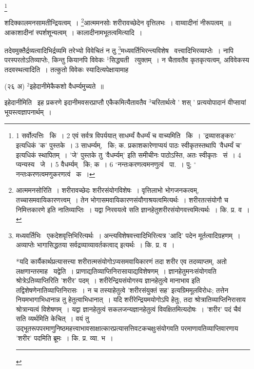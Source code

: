 \documentclass[11pt, openany]{book}
\newcommand\blfootnote[1]{%
 \begingroup
 \renewcommand\thefootnote{}\footnote{#1}%
 \addtocounter{footnote}{-1}%
 \endgroup
}
\begin{document}
\blfootnote{1 सर्वोत्पत्तिः  \textendash\ कि~। 2 एवं सर्वत्र विपर्ययात् साधर्म्यं वैधर्म्यं च वाच्यमिति  \textendash\ कि~। 'द्रव्यासङ्करः' इत्यधिकं 'क' पुस्तके~। 3 साधर्म्यम्, \textendash\ कि; क. प्रकाशकारेणाप्ययं पाठः स्वीकृतस्तथापि 'वैधर्म्यं च' इत्यधिकं स्थापितम्~। 'जे' पुस्तके तु 'वैधर्म्यम्' इति समीचीनः पाठोऽस्ति, अतः स्वीकृतः  \textendash\ सं~। 4 प्यन्यस्य \textendash\ जे~। 5 वैधर्म्यम्  \textendash\ कि; क~। 6 ${}^\circ$नन्तःकरणत्वमनणुत्वं \textendash\ पा.~। पु; ${}^\circ$नन्तःकरणत्वमणुकरणत्वं  \textendash\ क~।}

\newpage
\noindent
शदिक्कालमनसामतीन्द्रियत्वम्~। \renewcommand{\thefootnote}{१}\footnote{आत्ममनसोरिति~। शरीरावच्छेदः शरीरसंयोगविशेषः~। वृत्तिलाभो भोगजनकत्वम्, तच्चासमवायिकारणत्त्वम्~। तेन भोगासमवायिकारणसंयौगाश्रयत्वमित्यर्थः~। शरीरतत्संयोगौ च निमित्तकारणे इति नातिव्याप्तिः~। यद्वा निरवयत्वे सति ज्ञानहेतुशरीरसंयोगवत्त्वमित्यर्थः~। कि. प्र. व~।}आत्ममनसोः शरीरावच्छेदेन वृत्तिलभः~। वाय्वादीनां नीरूपत्वम्~॥ आकाशादीनां स्पर्शशून्यत्वम्~। कालादीनामभूतत्वमित्यादि~।

तदेवमुक्तैर्द्रव्यत्वादिभिर्द्रव्यमि तरेभ्यो विवेचितं न तु \renewcommand{\thefootnote}{२}\footnote{मध्यवर्तिभिः \textendash\ एकदेशवृत्तिभिरित्यर्थः~। अन्त्यविशेषवत्त्वादिभिरित्यत्र 'आदि' पदेन मूर्तत्वादिग्रहणम्~। अव्याप्तेः भागासिद्धतया सर्वद्रव्याव्यावर्तकत्वाद् इत्यर्थः~। कि. प्र. व~।

 *यदि कार्यैकार्थप्रत्यासत्त्या शरीरात्मसंयोगोऽप्यसमवायिकारणं तदा शरीर एव तदव्याप्तम्, अतो लक्षणान्तरमाह \textendash\ यद्वेति~। प्राणाद्यतिव्याप्तिनिरासायाद्यविशेषणम्~। ज्ञानहेतुमनःसंयोगवति श्रोत्रेऽतिव्याप्तिरिति 'शरीर' पदम्~। शरीरेन्द्रियसंयोगस्य ज्ञानहेतुत्वे मानाभाव इति तद्विशेषणेनातिव्याप्तिनिरासः~। न च तस्याहेतुत्वे 'शरीरसंयुक्तं सह' इत्यग्रिममूलविरोधः; तत्तेन नियमभागाभिधानान्न तु हेतुत्वाभिधानात्~। यदि शरीरेन्द्रियमयोगोऽपि हेतुः, तदा श्रोत्रातिव्याप्तिनिरासाय श्रोत्रान्यत्वं विशेषणम्~। यद्वा ज्ञानहेतुत्वं सकलजन्यज्ञानहेतुत्वं विवक्षितमित्यदोषः~। 'शरीर' पदं चैवं सति व्यर्थमिति केचित्~। वयं तु उद्भूतरूपपरमाणुनिष्ठमहत्त्वाभावसाक्षात्कारप्रत्यासत्तिवटकचक्षुःसंयोगवति परमाणावतिव्याप्तिवारणाय 'शरीर' पदमिति ब्रूमः~। कि. प्र. व्या. भ~।\\ \rule{0.4\linewidth}{0.5pt}}मध्यवर्तिभिरन्त्यविशेष \textendash\ वत्त्वादिभिरव्याप्तेः~। नापि परस्परतोऽतिव्याप्तेः, किन्तु कियानपि विवेकः ${}^1$सिद्ध्यती \textendash\ त्युक्तम्~। न चैतावतैव कृतकृत्यत्वम्, अविवेकस्य तदवस्थत्वादिति~। तत्कुतो विवेकः स्यादित्यपेक्षायामाह \textendash\ 

{\knu (२६ अ) ${}^2$इहेदानीमेकैकशो वैधर्म्यमुच्यते~॥}

{\knu इहेदानी}मिति  \textendash\ इह प्रकरणे इदानीमवसरप्राप्तौ एकैकमित्यैतावतैव ${}^3$चरितार्थत्वे ' शस् ' प्रत्ययोपादानं वीप्सायां भूयस्त्वज्ञापनार्थम्~।
\end{document}
